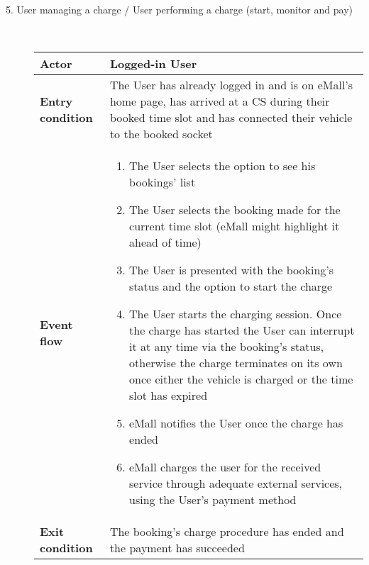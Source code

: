 \documentclass[11pt]{article}
\begin{document}
\begin{description}
    \item [5. User managing a charge / User performing a charge (start, monitor and pay)] \hfill \\
    \begin{table}[H]
        \centering
        \setlength{\tabcolsep}{18pt}
        \renewcommand{\arraystretch}{1.4}
        \begin{tabularx}{\textwidth}{|>{\hsize=0.5\hsize}X|>{\hsize=1.5\hsize}X|}
            \hline
            \textbf{Actor} & Logged-in User \\
            \hline
            \textbf{Entry condition} & The User has already logged in and is on eMall's home page, has arrived at a CS during their booked time slot and has connected their vehicle to the booked socket \\
            \hline
            \textbf{Event flow} & 
                \begin{minipage}[t]{\hsize}
                \begin{enumerate}[topsep=0pt, leftmargin=*]
                    \item The User selects the option to see his bookings' list
                    \item The User selects the booking made for the current time slot (eMall might highlight it ahead of time)
                    \item The User is presented with the booking's status and the option to start the charge
                    \item The User starts the charging session. Once the charge has started the User can interrupt it at any time via the booking's status, otherwise the charge terminates on its own once either the vehicle is charged or the time slot has expired
                    \item eMall notifies the User once the charge has ended
                    \item eMall charges the user for the received service through adequate external services, using the User's payment method
                \end{enumerate}
                \end{minipage}
                \vspace{6pt}
            \\
            \hline
            \textbf{Exit condition} & The booking's charge procedure has ended and the payment has succeeded \\

\end{tabularx}
\end{table}
\end{description}
\end{document}
